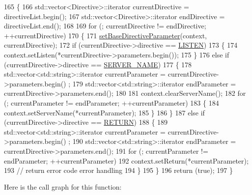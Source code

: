 \begin{DoxyCode}
165     \{
166         std::vector<Directive>::iterator    currentDirective = directiveList.begin();
167         std::vector<Directive>::iterator    endDirective = directiveList.end();
168 
169         \textcolor{keywordflow}{for} (; currentDirective != endDirective; ++currentDirective)
170         \{
171             \hyperlink{classft_1_1_parser_a9f412d172694519d0d8dd9edacd257c0}{setBaseDirectiveParameter}(context, currentDirective);
172             \textcolor{keywordflow}{if} (currentDirective->directive == \hyperlink{namespaceft_a5a5554dff10f0dc50bae4cc5825ad75da331ec9878c0ed22e62de969d4b96b5bb}{LISTEN})
173             \{
174                 context.setListen(*currentDirective->parameters.begin());
175             \}
176             \textcolor{keywordflow}{else} \textcolor{keywordflow}{if} (currentDirective->directive == \hyperlink{namespaceft_a5a5554dff10f0dc50bae4cc5825ad75da8e7adb687472b53e3ed632cbcb949d88}{SERVER\_NAME})
177             \{
178                 std::vector<std::string>::iterator  currentParameter = currentDirective->parameters.begin()
      ;
179                 std::vector<std::string>::iterator      endParameter = currentDirective->parameters.end();
180 
181                 context.clearServerName();
182                 \textcolor{keywordflow}{for} (; currentParameter != endParameter; ++currentParameter)
183                 \{
184                     context.setServerName(*currentParameter);
185                 \}
186             \}
187             \textcolor{keywordflow}{else} \textcolor{keywordflow}{if} (currentDirective->directive == \hyperlink{namespaceft_a5a5554dff10f0dc50bae4cc5825ad75da520e09ffec033636dba711f3441cc600}{RETURN})
188             \{
189                 std::vector<std::string>::iterator  currentParameter = currentDirective->parameters.begin()
      ;
190                 std::vector<std::string>::iterator      endParameter = currentDirective->parameters.end();
191                 \textcolor{keywordflow}{for} (; currentParameter != endParameter; ++currentParameter)
192                     context.setReturn(*currentParameter);
193                 \textcolor{comment}{// return error code error handling}
194             \}
195         \}
196         \textcolor{keywordflow}{return} (\textcolor{keyword}{true});
197     \}
\end{DoxyCode}
Here is the call graph for this function\+:
\nopagebreak
